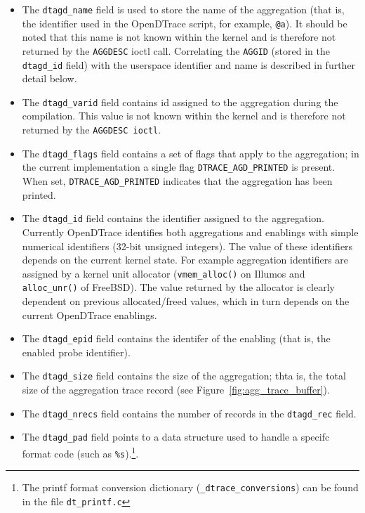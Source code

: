 \begin{itemize}

	\item The \texttt{dtagd\_name} field is used to store the name of the
aggregation (that is, the identifier used in the OpenDTrace script, for example,
\texttt{@a}). It should be noted that this name is not known within the kernel and
is therefore not returned by the \texttt{AGGDESC} ioctl call. Correlating the
\texttt{AGGID} (stored in the \texttt{dtagd\_id} field) with the userspace
identifier and name is described in further detail below.

	\item The \texttt{dtagd\_varid} field contains id assigned to the
aggregation during the compilation. This value is not known within the kernel
and is therefore not returned by the \texttt{AGGDESC ioctl}.

	\item The \texttt{dtagd\_flags} field contains a set of flags that apply to
the aggregation; in the current implementation a single flag 
\texttt{DTRACE\_AGD\_PRINTED} is present. When set,
\texttt{DTRACE\_AGD\_PRINTED} indicates that the aggregation has been printed.

	\item The \texttt{dtagd\_id} field contains the identifier assigned to the
aggregation. Currently OpenDTrace identifies both aggregations and enablings with
simple numerical identifiers (32-bit unsigned integers). The value of these
identifiers depends on the current kernel state. For example aggregation identifiers
are assigned by a kernel unit allocator (\texttt{vmem\_alloc()} on Illumos and
\texttt{alloc\_unr()} of FreeBSD). The value returned by the allocator is
clearly dependent on previous allocated/freed values, which in turn depends on
the current OpenDTrace enablings.

	\item The \texttt{dtagd\_epid} field contains the identifer of the enabling
(that is, the enabled probe identifier).

	\item The \texttt{dtagd\_size} field contains the size of the aggregation;
thta is, the total size of the aggregation trace record (see
Figure~\ref{fig:agg_trace_buffer}).

	\item The \texttt{dtagd\_nrecs} field contains the number of records in
the \texttt{dtagd\_rec} field.

	\item The \texttt{dtagd\_pad} field points to a data structure used to
handle a specifc format code (such as \texttt{\%s}).\footnote{The printf format
conversion dictionary (\texttt{\_dtrace\_conversions}) can be found in the
		file \texttt{dt\_printf.c}}.


\end{itemize}
